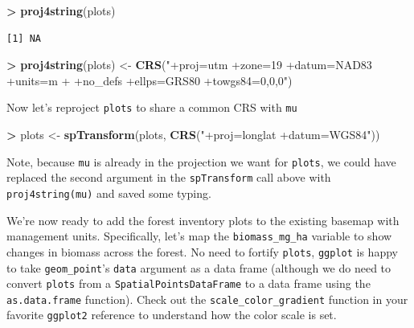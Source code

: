 \documentclass[]{krantz}
\makeatletter
\newenvironment{Shaded}{\begin{snugshade}}{\end{snugshade}}
\newcommand{\KeywordTok}[1]{\textcolor[rgb]{0.27,0.27,0.27}{\textbf{#1}}}
\newcommand{\NormalTok}[1]{#1}
\newcommand{\OperatorTok}[1]{\textcolor[rgb]{0.43,0.43,0.43}{\textbf{#1}}}
\newcommand{\StringTok}[1]{\textcolor[rgb]{0.5,0.5,0.5}{#1}}
\newenvironment{kframe}{%
\medskip{}
\setlength{\fboxsep}{.8em}
 \def\at@end@of@kframe{}%
 \ifinner\ifhmode%
  \def\at@end@of@kframe{\end{minipage}}%
  \begin{minipage}{\columnwidth}%
 \fi\fi%
 \def\FrameCommand##1{\hskip\@totalleftmargin \hskip-\fboxsep
 \colorbox{shadecolor}{##1}\hskip-\fboxsep
     \hskip-\linewidth \hskip-\@totalleftmargin \hskip\columnwidth}%
 \MakeFramed {\advance\hsize-\width
   \@totalleftmargin\z@ \linewidth\hsize
   \@setminipage}}%
 {\par\unskip\endMakeFramed%
 \at@end@of@kframe}
\renewenvironment{Shaded}{\begin{kframe}}{\end{kframe}}
\makeatother
\begin{document}
\begin{Shaded}
\begin{Highlighting}[]
\OperatorTok{>}\StringTok{ }\KeywordTok{proj4string}\NormalTok{(plots)}
\end{Highlighting}
\end{Shaded}

\begin{verbatim}
[1] NA
\end{verbatim}

\begin{Shaded}
\begin{Highlighting}[]
\OperatorTok{>}\StringTok{ }\KeywordTok{proj4string}\NormalTok{(plots) <-}\StringTok{ }\KeywordTok{CRS}\NormalTok{(}\StringTok{"+proj=utm +zone=19 +datum=NAD83 +units=m }
\StringTok{+                              +no_defs +ellps=GRS80 +towgs84=0,0,0"}\NormalTok{)                   }
\end{Highlighting}
\end{Shaded}

Now let's reproject \texttt{plots} to share a common CRS with \texttt{mu}

\begin{Shaded}
\begin{Highlighting}[]
\OperatorTok{>}\StringTok{ }\NormalTok{plots <-}\StringTok{ }\KeywordTok{spTransform}\NormalTok{(plots, }\KeywordTok{CRS}\NormalTok{(}\StringTok{"+proj=longlat +datum=WGS84"}\NormalTok{))}
\end{Highlighting}
\end{Shaded}

Note, because \texttt{mu} is already in the projection we want for \texttt{plots}, we could have replaced the second argument in the \texttt{spTransform} call above with \texttt{proj4string(mu)} and saved some typing.

We're now ready to add the forest inventory plots to the existing basemap with management units. Specifically, let's map the \texttt{biomass\_mg\_ha} variable to show changes in biomass across the forest. No need to fortify \texttt{plots}, \texttt{ggplot} is happy to take \texttt{geom\_point}'s \texttt{data} argument as a data frame (although we do need to convert \texttt{plots} from a \texttt{SpatialPointsDataFrame} to a data frame using the \texttt{as.data.frame} function). Check out the \texttt{scale\_color\_gradient} function in your favorite \texttt{ggplot2} reference to understand how the color scale is set.
\end{document}

